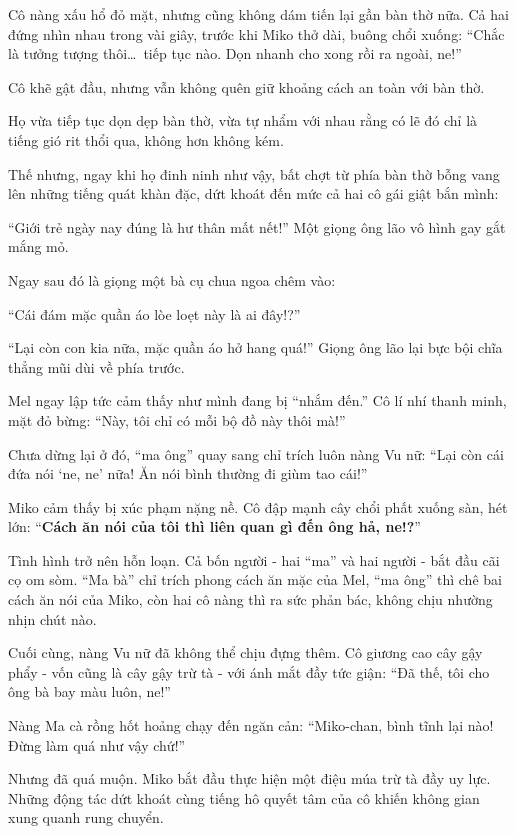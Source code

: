 \documentclass[../main.tex]{subfiles}
\begin{document}
Cô nàng xấu hổ đỏ mặt, nhưng cũng không dám tiến lại gần bàn thờ nữa. Cả hai đứng nhìn nhau trong vài giây, trước khi Miko thở dài, buông chổi xuống: ``Chắc là tưởng tượng thôi\dots\ tiếp tục nào. Dọn nhanh cho xong rồi ra ngoài, ne!''

Cô khẽ gật đầu, nhưng vẫn không quên giữ khoảng cách an toàn với bàn thờ.

Họ vừa tiếp tục dọn dẹp bàn thờ, vừa tự nhẩm với nhau rằng có lẽ đó chỉ là tiếng gió rit thổi qua, không hơn không kém.

Thế nhưng, ngay khi họ đinh ninh như vậy, bất chợt từ phía bàn thờ bỗng vang lên những tiếng quát khàn đặc, dứt khoát đến mức cả hai cô gái giật bắn mình:

``Giới trẻ ngày nay đúng là hư thân mất nết!'' Một giọng ông lão vô hình gay gắt mắng mỏ.

Ngay sau đó là giọng một bà cụ chua ngoa chêm vào:

``Cái đám mặc quần áo lòe loẹt này là ai đây!?''

``Lại còn con kia nữa, mặc quần áo hở hang quá!'' Giọng ông lão lại bực bội chĩa thẳng mũi dùi về phía trước.

Mel ngay lập tức cảm thấy như mình đang bị ``nhắm đến.'' Cô lí nhí thanh minh, mặt đỏ bừng: ``Này, tôi chỉ có mỗi bộ đồ này thôi mà!''

Chưa dừng lại ở đó, ``ma ông'' quay sang chỉ trích luôn nàng Vu nữ: ``Lại còn cái đứa nói `ne, ne' nữa! Ăn nói bình thường đi giùm tao cái!''

Miko cảm thấy bị xúc phạm nặng nề. Cô đập mạnh cây chổi phất xuống sàn, hét lớn: ``\textbf{Cách ăn nói của tôi thì liên quan gì đến ông hả, ne!?}''

Tình hình trở nên hỗn loạn. Cả bốn người - hai ``ma'' và hai người - bắt đầu cãi cọ om sòm. ``Ma bà'' chỉ trích phong cách ăn mặc của Mel, ``ma ông'' thì chê bai cách ăn nói của Miko, còn hai cô nàng thì ra sức phản bác, không chịu nhường nhịn chút nào.

Cuối cùng, nàng Vu nữ đã không thể chịu đựng thêm. Cô giương cao cây gậy phẩy - vốn cũng là cây gậy trừ tà - với ánh mắt đầy tức giận: ``Đã thế, tôi cho ông bà bay màu luôn, ne!''

Nàng Ma cà rồng hốt hoảng chạy đến ngăn cản: ``Miko-chan, bình tĩnh lại nào! Đừng làm quá như vậy chứ!''

Nhưng đã quá muộn. Miko bắt đầu thực hiện một điệu múa trừ tà đầy uy lực. Những động tác dứt khoát cùng tiếng hô quyết tâm của cô khiến không gian xung quanh rung chuyển.
\end{document}
